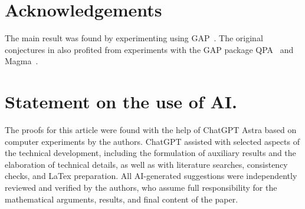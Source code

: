 \documentclass[11pt,a4paper]{amsart}
\numberwithin{equation}{section}
\begin{document}
\section*{Acknowledgements}
The main result was found by experimenting using GAP~\cite{GAP}. The original conjectures in \cite{EKM} also profited from experiments with the GAP package 
QPA~\cite{GS} and Magma~\cite{BCP}.


\section*{Statement on the use of AI.}
The proofs for this article were found with the help of ChatGPT Astra based on computer experiments by the authors. 
ChatGPT assisted with selected aspects of the technical development, including
the formulation of auxiliary results and the elaboration of technical details,
as well as with literature searches, consistency checks, and LaTex
preparation. All AI-generated suggestions were independently reviewed and
verified by the authors, who assume full responsibility for the mathematical
arguments, results, and final content of the paper.
\end{document}
